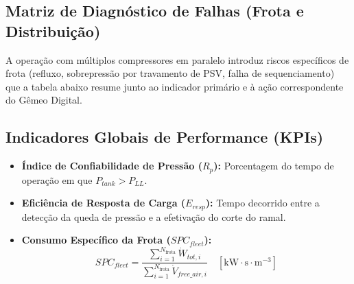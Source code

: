 \documentclass[12pt,a4paper]{article}
\numberwithin{equation}{section}
\numberwithin{table}{section}
\numberwithin{figure}{section}
\begin{document}
\subsection{Matriz de Diagnóstico de Falhas (Frota e Distribuição)}

A operação com múltiplos compressores em paralelo introduz riscos específicos de frota (refluxo, sobrepressão por travamento de PSV, falha de sequenciamento) que a tabela abaixo resume junto ao indicador primário e à ação correspondente do Gêmeo Digital.
\begin{table}[h!]
\centering
\noindent{}
\caption{Matriz de diagnóstico de falhas de frota e distribuição (header e vasos pulmão).}
\end{table}

\subsection{Indicadores Globais de Performance (KPIs)}

\begin{itemize}
	\item \textbf{Índice de Confiabilidade de Pressão ($R_p$):} Porcentagem do tempo de operação em que $P_{tank} > P_{LL}$.
	\item \textbf{Eficiência de Resposta de Carga ($E_{resp}$):} Tempo decorrido entre a detecção da queda de pressão e a efetivação do corte do ramal.
	\item \textbf{Consumo Específico da Frota ($SPC_{fleet}$):}
	\begin{equation}\label{eq:s16-6}
SPC_{fleet} = \frac{\sum_{i=1}^{N_{\text{frota}}} \dot{W}_{tot,i}}{\sum_{i=1}^{N_{\text{frota}}} \dot{V}_{free\_air,i}} \quad [\text{kW} \cdotp \text{s} \cdotp \text{m}^{-3}]
\end{equation}
\end{itemize}
\end{document}
